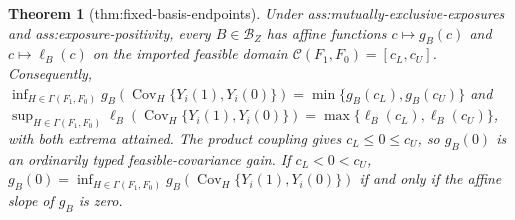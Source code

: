 \documentclass{article}
\newtheorem{theorem}{Theorem}
\begin{document}
\begin{theorem}[thm:fixed-basis-endpoints]\label{thm:fixed-basis-endpoints}
Under ass:mutually-exclusive-exposures and ass:exposure-positivity, every \(B\in\mathcal B_Z\) has affine functions \(c\mapsto g_B(c)\) and \(c\mapsto\ell_B(c)\) on the imported feasible domain \(\mathcal C(F_1,F_0)=[c_L,c_U]\). Consequently, \(\inf_{H\in\Gamma(F_1,F_0)}g_B(\operatorname{Cov}_H\{Y_i(1),Y_i(0)\})=\min\{g_B(c_L),g_B(c_U)\}\) and \(\sup_{H\in\Gamma(F_1,F_0)}\ell_B(\operatorname{Cov}_H\{Y_i(1),Y_i(0)\})=\max\{\ell_B(c_L),\ell_B(c_U)\}\), with both extrema attained. The product coupling gives \(c_L\le0\le c_U\), so \(g_B(0)\) is an ordinarily typed feasible-covariance gain. If \(c_L<0<c_U\), \(g_B(0)=\inf_{H\in\Gamma(F_1,F_0)}g_B(\operatorname{Cov}_H\{Y_i(1),Y_i(0)\})\) if and only if the affine slope of \(g_B\) is zero.
\end{theorem}
\end{document}
